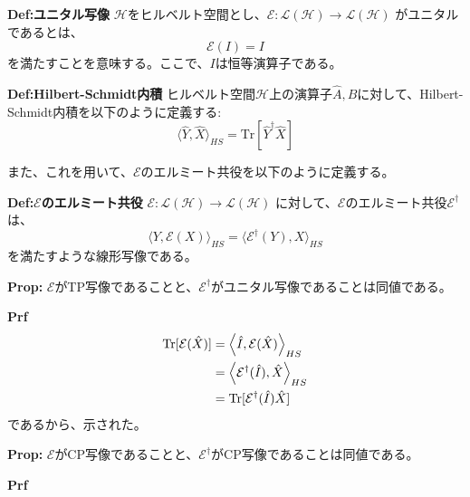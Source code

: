 \documentclass[a4paper,11pt]{jsarticle}
\numberwithin{equation}{section}
\begin{document}
\begin{itembox}[l]{\textbf{Def:ユニタル写像}}
    $\mathcal H$をヒルベルト空間とし、$\mathcal{E} : \mathcal{L}(\mathcal{H}) \rightarrow \mathcal{L}(\mathcal{H})$ がユニタルであるとは、
    \begin{equation}
        \mathcal{E}(I) = I
    \end{equation}
    を満たすことを意味する。ここで、$I$は恒等演算子である。
\end{itembox}

\begin{itembox}[l]{\textbf{Def:Hilbert-Schmidt内積}}
    ヒルベルト空間$\mathcal{H}$上の演算子$\hat{A},\hat{B}$に対して、Hilbert-Schmidt内積を以下のように定義する:
    \begin{equation}
        \langle \hat{Y},\hat{X} \rangle_{HS} = \text{Tr}[\hat{Y}^{\dagger}\hat{X}]
    \end{equation}

\end{itembox}
また、これを用いて、$\mathcal{E}$のエルミート共役を以下のように定義する。
\begin{itembox}[l]{\textbf{Def:$\mathcal{E}$のエルミート共役}}
    $\mathcal{E} : \mathcal{L}(\mathcal{H}) \rightarrow \mathcal{L}(\mathcal{H})$ に対して、$\mathcal{E}$のエルミート共役$\mathcal{E}^{\dagger}$は、
    \begin{equation}
        \langle Y,\mathcal{E}(X) \rangle_{HS} = \langle \mathcal{E}^{\dagger}(Y),X \rangle_{HS}
    \end{equation}
    を満たすような線形写像である。

\end{itembox}

\begin{itembox}[l]{\textbf{Prop:}}
    $\mathcal E$がTP写像であることと、$\mathcal E^{\dagger}$がユニタル写像であることは同値である。
\end{itembox}
\textbf{Prf}\\
\begin{align}
    \Trace[\mathcal E(\hat X)] &= \ev{\hat{I},\mathcal E(\hat X)}_{HS}\\
    &= \ev{\mathcal E^{\dagger}(\hat I),\hat X}_{HS}\\
    &= \Trace[\mathcal E^{\dagger}(\hat I)\hat X]
\end{align}
であるから、示された。\hfill \qedsymbol\\

\begin{itembox}[l]{\textbf{Prop:}}
    $\mathcal E$がCP写像であることと、$\mathcal E^{\dagger}$がCP写像であることは同値である。

\end{itembox}
\textbf{Prf}\\
\end{document}
